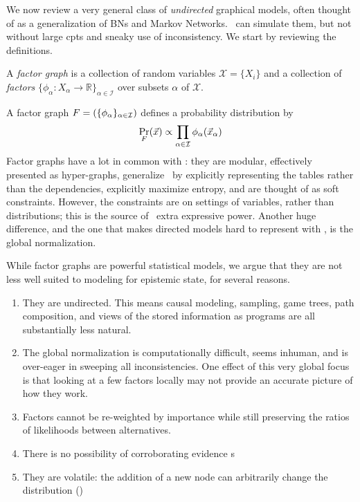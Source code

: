 	We now review a very general class of \emph{undirected} graphical models, often thought of as a generalization of BNs and Markov Networks. \MNs\ can simulate them, but not without large cpts and sneaky use of inconsistency. 
	We start by reviewing the definitions.
	
	\begin{defn}
		A \emph{factor graph} is a collection of random variables $\mathcal X = \{X_i\}$ and a collection of \emph{factors} $\{\phi_\alpha\colon X_\alpha \to \mathbb R\}_{\alpha \in \mathcal I }$ over subsets $\alpha$ of $\mathcal X$.
	\end{defn}

	A factor graph $F = (\{\phi_\alpha\}_{\alpha \in \cal I})$ defines a probability distribution by 
	\[ \Pr_F(\vec x) \propto \prod_{\alpha \in \cal I} \phi_\alpha(\vec x_{\alpha}) \]
	Factor graphs have a lot in common with \MNs: they are modular, effectively presented as hyper-graphs, generalize \MNs\ by explicitly representing the tables rather than the dependencies, explicitly maximize entropy, and are thought of as soft constraints.
	However, the constraints are on settings of variables, rather than distributions; this is the source of \MNs\ extra expressive power.
	Another huge difference, and the one that makes directed models hard to represent with \MNs, is the global normalization.

	While factor graphs are powerful statistical models, we argue that they are not less well suited to modeling for epistemic state, for several reasons. 
	\begin{enumerate}
		\item They are undirected. This means causal modeling, sampling, game trees, path composition, and views of the stored information as programs are all substantially less natural. \label{fgproblem:undirected}
		\item The global normalization is computationally difficult, seems inhuman, and is over-eager in sweeping all inconsistencies. One effect of this very global focus is that looking at a few factors locally may not provide an accurate picture of how they work. \label{fgproblem:global}
		\item Factors cannot be re-weighted by importance while still preserving the ratios of likelihoods between alternatives. \label{fgproblem:reweight}
		\item There is no possibility of corroborating evidence \label{fgproblem:corrob}s
		\item They are volatile: the addition of a new node can arbitrarily change the distribution \label{fgproblem:volatile} ()
	\end{enumerate}
	
